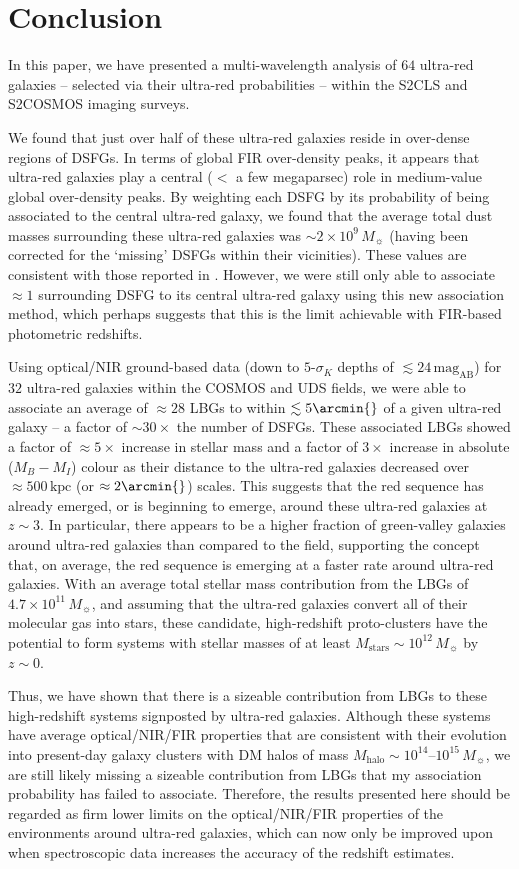 \documentclass[a4paper, fleqn, usenatbib]{mnras}
\newcommand{\kiloparsec}{\text{kpc}}
\newcommand{\magab}{\text{mag}_{\text{AB}}}
\newcommand{\mhalo}{M_{\text{halo}}}
\newcommand{\msol}{M_{\sun}}
\newcommand{\mstars}{M_{\text{stars}}}
\newcommand{\urg}{ultra-red galaxy}
\newcommand{\urgs}{ultra-red galaxies}
\begin{document}
\section{Conclusion}

In this paper, we have presented a multi-wavelength analysis of $64$ \urgs{} -- selected via their ultra-red probabilities -- within the S2CLS and S2COSMOS imaging surveys.

We found that just over half of these \urgs{} reside in over-dense regions of DSFGs.
In terms of global FIR over-density peaks, it appears that \urgs{} play a central ($<$ a few megaparsec) role in medium-value global over-density peaks.
By weighting each DSFG by its probability of being associated to the central \urg{}, we found that the average total dust masses surrounding these \urgs{} was $\sim2\times10^{9}\,\msol{}$ (having been corrected for the `missing' DSFGs within their vicinities).
These values are consistent with those reported in .
However, we were still only able to associate $\approx1$ surrounding DSFG to its central \urg{} using this new association method, which perhaps suggests that this is the limit achievable with FIR-based photometric redshifts.

Using optical/NIR ground-based data (down to $5\text{-}\sigma_{K}$ depths of $\lesssim24\,\magab{}$) for $32$ \urgs{} within the COSMOS and UDS fields, we were able to associate an average of $\approx28$ LBGs to within $\lesssim5\arcmin{}$ of a given \urg{} -- a factor of $\sim30\times$ the number of DSFGs.
These associated LBGs showed a factor of $\approx5\times$ increase in stellar mass and a factor of $3\times$ increase in absolute ($M_{B}-M_{I}$) colour as their distance to the \urgs{} decreased over $\approx500\,\kiloparsec{}$ (or $\approx2\arcmin{}$) scales.
This suggests that the red sequence has already emerged, or is beginning to emerge, around these \urgs{} at $z\sim3$.
In particular, there appears to be a higher fraction of green-valley galaxies around \urgs{} than compared to the field, supporting the concept that, on average, the red sequence is emerging at a faster rate around \urgs{}.
With an average total stellar mass contribution from the LBGs of $4.7\times10^{11}\,\msol{}$, and assuming that the \urgs{} convert all of their molecular gas into stars, these candidate, high-redshift proto-clusters have the potential to form systems with stellar masses of at least $\mstars{}\sim10^{12}\,\msol{}$ by $z\sim0$.

Thus, we have shown that there is a sizeable contribution from LBGs to these high-redshift systems signposted by \urgs{}.
Although these systems have average optical/NIR/FIR properties that are consistent with their evolution into present-day galaxy clusters with DM halos of mass $\mhalo{}\sim10^{14}\text{--}10^{15}\,\msol{}$, we are still likely missing a sizeable contribution from LBGs that my association probability has failed to associate.
Therefore, the results presented here should be regarded as firm lower limits on the optical/NIR/FIR properties of the environments around \urgs{}, which can now only be improved upon when spectroscopic data increases the accuracy of the redshift estimates.
\end{document}
